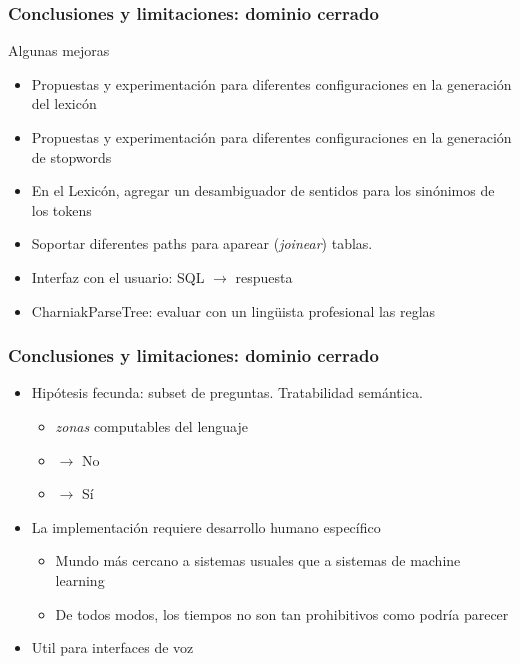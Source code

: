 \begin{frame}[<+->]
\frametitle{Conclusiones y limitaciones: dominio cerrado}
Algunas mejoras
\begin{itemize}
\item Propuestas y experimentación para diferentes configuraciones en la generación del lexicón
\item Propuestas y experimentación para diferentes configuraciones en la generación de stopwords
\item En el Lexicón, agregar un desambiguador de sentidos para los sinónimos de los tokens
\item Soportar diferentes paths para aparear (\textit{joinear}) tablas.
\item Interfaz con el usuario: SQL $\rightarrow$ respuesta
\item CharniakParseTree: evaluar con un lingüista profesional las reglas

\end{itemize}
\end{frame}


\begin{frame}[<+->]
\frametitle{Conclusiones y limitaciones: dominio cerrado}

\begin{itemize}
  \item Hipótesis fecunda: subset de preguntas. Tratabilidad semántica.
  \begin{itemize}
    \item \textit{zonas} computables del lenguaje
    \item {} $\rightarrow$ {\color{red}No}
    \item {} $\rightarrow$ {\color{green}Sí}
  \end{itemize}
  \item La implementación requiere desarrollo humano específico
  \begin{itemize}
    \item Mundo más cercano a sistemas usuales que a sistemas de machine learning
    \item De todos modos, los tiempos no son tan prohibitivos como podría parecer
  \end{itemize}
  \item Util para interfaces de voz
  \end{itemize}

\end{frame}




